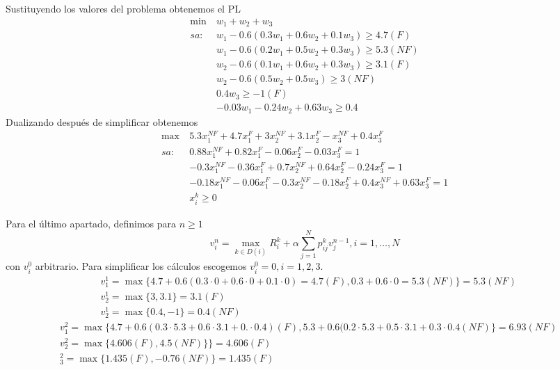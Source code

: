 \documentclass[twoside]{article}
\begin{document}
\begin{ejercicio}{2}
\begin{solucion}
Sustituyendo los valores del problema obtenemos el PL
\begin{align*}
\min\ & w_1+w_2+w_3\\
sa: & w_1-0.6(0.3w_1+0.6w_2+0.1w_3)\geq 4.7 (F)\\
    & w_1-0.6(0.2w_1+0.5w_2+0.3w_3)\geq 5.3 (NF)\\
    & w_2-0.6(0.1w_1+0.6w_2+0.3w_3)\geq 3.1 (F)\\
    & w_2-0.6(0.5w_2+0.5w_3)\geq 3 (NF)\\
    & 0.4w_3\geq -1(F)\\
    & -0.03w_1-0.24w_2+0.63w_3\geq 0.4
\end{align*}
Dualizando después de simplificar obtenemos
\begin{align*}
\max\ & 5.3x_1^{NF}+4.7x_1^F+3x_2^{NF}+3.1x_2^F-x_3^{NF}+0.4x_3^F\\
sa:  & 0.88x_1^{NF}+0.82x_1^F-0.06x_2^F-0.03x_3^F=1\\
     & -0.3x_1^{NF}-0.36x_1^F+0.7x_2^{NF}+0.64x_2^F-0.24x_3^F=1\\
     & -0.18x_1^{NF}-0.06x_1^F-0.3x_2^{NF}-0.18x_2^F+0.4x_3^{NF}+0.63x_3^F=1\\
     & x_i^k\geq 0
\end{align*}

Para el último apartado, definimos para $n\geq 1$ $$v_i^n=\max_{k\in D(i)} R_i^k+\alpha\sum_{j=1}^N p_{ij}^k v_j^{n-1}, i=1,\dots, N$$
con $v_i^0$ arbitrario. Para simplificar los cálculos escogemos $v_i^0=0, i=1,2,3$. 
\begin{align*}
& v_1^1=\max\{4.7+0.6(0.3\cdot 0+0.6\cdot0+0.1\cdot 0)=4.7(F), 0.3+0.6\cdot0=5.3(NF)\}=5.3(NF)\\
& v_2^1=\max\{3,3.1\}=3.1(F)\\
& v_2^1=\max\{0.4,-1\}=0.4(NF)
\end{align*}
\begin{align*}
& v_1^2=\max\{4.7+0.6(0.3\cdot 5.3+0.6\cdot 3.1+0.\cdot 0.4)(F),5.3+0.6(0.2\cdot 5.3+0.5\cdot 3.1+0.3\cdot0.4 (NF)\}=6.93(NF)\\
& v_2^2=\max\{4.606(F),4.5(NF)\}\}=4.606(F)\\
& _3^2=\max\{1.435(F),-0.76(NF)\}=1.435(F)
\end{align*}
\end{solucion}

\end{ejercicio}

\newpage 
\end{document}
